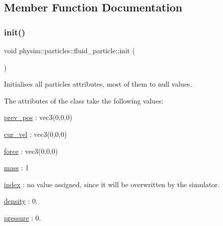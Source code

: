 \subsection{Member Function Documentation}
\mbox{\label{classphysim_1_1particles_1_1fluid__particle_a0aa522f9400bcb02373edd7bb073249b}} 
\subsubsection{\texorpdfstring{init()}{init()}}
{\footnotesize\ttfamily void physim\+::particles\+::fluid\+\_\+particle\+::init (\begin{DoxyParamCaption}{ }\end{DoxyParamCaption})\hspace{0.3cm}{\ttfamily [virtual]}}



Initialises all particle\textquotesingle{}s attributes, most of them to null values. 

The attributes of the class take the following values\+:
\begin{DoxyItemize}
\item \hyperlink{classphysim_1_1particles_1_1base__particle_a08072db6a1a59d21acc9cac6ac8965f7}{prev\+\_\+pos} \+: vec3(0,0,0)
\item \hyperlink{classphysim_1_1particles_1_1base__particle_a66a164d2a130c40901e3ec2709cdad43}{cur\+\_\+vel} \+: vec3(0,0,0)
\item \hyperlink{classphysim_1_1particles_1_1base__particle_adc3b11899d2e50970ae5d4931721a0ef}{force} \+: vec3(0,0,0)
\item \hyperlink{classphysim_1_1particles_1_1base__particle_acb5c9f0b4a911d8981210e2cfc4dda8a}{mass} \+: 1
\item \hyperlink{classphysim_1_1particles_1_1base__particle_a44f5de3bb4b860dfd511e28e1d6519d5}{index} \+: no value assigned, since it will be overwritten by the simulator.
\item \hyperlink{classphysim_1_1particles_1_1fluid__particle_a0664c7d411aae32890f6fd359c74f2bc}{density} \+: 0.
\item \hyperlink{classphysim_1_1particles_1_1fluid__particle_a2829dc6a83026e0854dd0ef4064f19b6}{pressure} \+: 0. 
\end{DoxyItemize}


